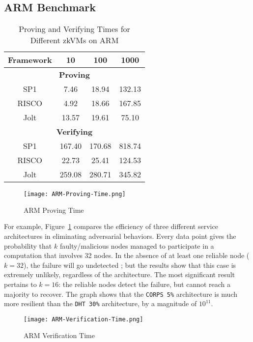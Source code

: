 \documentclass{scrartcl}
\begin{document}
\subsection{ARM Benchmark}

\begin{table}[h!]
	\centering
	\caption{Proving and Verifying Times for Different zkVMs on ARM}
	\begin{tabular}{|c|c|c|c|}
	\hline
	\textbf{Framework} & \textbf{10} & \textbf{100} & \textbf{1000} \\ \hline
	\multicolumn{4}{|c|}{\textbf{Proving}} \\ \hline
	SP1 & 7.46 & 18.94 & 132.13 \\ \hline
	RISCO & 4.92 & 18.66 & 167.85 \\ \hline
	Jolt & 13.57 & 19.61 & 75.10 \\ \hline
	\multicolumn{4}{|c|}{\textbf{Verifying}} \\ \hline
	SP1 & 167.40 & 170.68 & 818.74 \\ \hline
	RISCO & 22.73 & 25.41 & 124.53 \\ \hline
	Jolt & 259.08 & 280.71 & 345.82 \\ \hline
	\end{tabular}
	\label{tab:proving-verifying-times}
	\end{table}

\begin{figure}
	\begin{center}
		\texttt{[image: ARM-Proving-Time.png]}
	\end{center}
	\caption{ARM Proving Time}
	\label{graph:arm-proving-time}
\end{figure}

For example, Figure~\ref{graph:arm-proving-time} compares the efficiency of three different service architectures in eliminating adversarial behaviors. Every data point gives the probability that $k$ faulty/malicious nodes managed to participate in a computation that involves 32 nodes. In the absence of at least one reliable node ($k = 32$), the failure will go undetected ; but the results show that this case is extremely unlikely, regardless of the architecture. The most significant result pertains to $k = 16$: the reliable nodes detect the failure, but cannot reach a majority to recover. The graph shows that the \texttt{CORPS 5\%} architecture is much more resilient than the \texttt{DHT 30\%} architecture, by a magnitude of $10^{11}$.

\begin{figure}
	\begin{center}
		\texttt{[image: ARM-Verification-Time.png]}
	\end{center}
	\caption{ARM Verification Time}
	\label{graph:arm-verification-time}
\end{figure}
\end{document}
